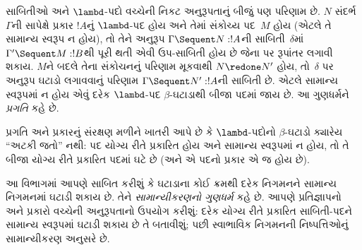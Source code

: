 સાબિતીઓ અને $\lambd$-પદો વચ્ચેની નિકટ અનુરૂપતાનું
બીજું પણ પરિણામ છે.
$N$ સંદર્ભ~$\Gamma$ની સાપેક્ષે પ્રકાર $!A$નું
$\lambd$-પદ હોય અને તેમાં સંકોચ્ય પદ~$M$ હોય
(એટલે તે સામાન્ય સ્વરૂપ ન હોય), તો તેને અનુરૂપ
$\Gamma \Sequent N : !A$ની  સાબિતી~$\delta$માં
$\Gamma' \Sequent M: !B$થી પૂરી થતી એવી
ઉપ-સાબિતી હોય છે જેના પર રૂપાંતર લગાવી શકાય.
$M$ને બદલે તેના સંકોચનનું પરિણામ મૂકવાથી
$N \redone N'$ હોય, તો~$\delta$ પર
અનુરૂપ ઘટાડો લગાવવાનું પરિણામ
$\Gamma \Sequent N' : !A$ની સાબિતી છે.
એટલે સામાન્ય સ્વરૂપમાં ન હોય એવું દરેક $\lambd$-પદ
$\beta$-ઘટાડાથી બીજા પદમાં જાય છે.
આ ગુણધર્મને \emph{પ્રગતિ} કહે છે.

પ્રગતિ અને પ્રકારનું સંરક્ષણ મળીને ખાતરી આપે છે
કે $\lambd$-પદોનો $\beta$-ઘટાડો ક્યારેય ``અટકી જતો'' નથી:
પદ યોગ્ય રીતે પ્રકારિત હોય અને સામાન્ય સ્વરૂપમાં ન હોય,
તો તે બીજા યોગ્ય રીતે પ્રકારિત પદમાં ઘટે છે
(અને એ પદનો પ્રકાર એ જ હોય છે).
\endgroup

\begingroup
\makeatletter{}\makeatother


\label{guunit:OLP-0687}


આ વિભાગમાં આપણે સાબિત કરીશું કે ઘટાડાના
કોઈ ક્રમથી દરેક નિગમનને સામાન્ય નિગમનમાં
ઘટાડી શકાય છે. તેને \emph{સામાન્યીકરણનો ગુણધર્મ}
કહે છે. આપણે પ્રતિજ્ઞાપનો અને પ્રકારો વચ્ચેની
અનુરૂપતાનો ઉપયોગ કરીશું: દરેક યોગ્ય રીતે પ્રકારિત સાબિતી-પદને
સામાન્ય સ્વરૂપમાં ઘટાડી શકાય છે તે બતાવીશું;
પછી સ્વાભાવિક નિગમનની નિષ્પત્તિઓનું
સામાન્યીકરણ અનુસરે છે.

